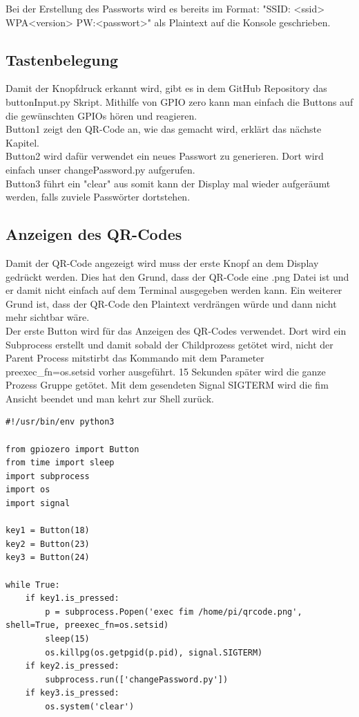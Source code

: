 \documentclass[a4paper,11pt,singlespacing]{article}
\begin{document}
    		Bei der Erstellung des Passworts wird es bereits im Format: "SSID: <ssid> WPA<version> PW:<passwort>" als Plaintext auf die Konsole geschrieben.
    		
    		\subsection{Tastenbelegung}
    		    Damit der Knopfdruck erkannt wird, gibt es in dem GitHub Repository \cite{Quote_github_repo} das buttonInput.py Skript. Mithilfe von GPIO zero kann man einfach die Buttons auf die gewünschten GPIOs hören und reagieren. \\
	    		Button1 zeigt den QR-Code an, wie das gemacht wird, erklärt das nächste Kapitel. \\
	    		Button2 wird dafür verwendet ein neues Passwort zu generieren. Dort wird einfach unser changePassword.py aufgerufen. \\
	    		Button3 führt ein "clear" aus somit kann der Display mal wieder aufgeräumt werden, falls zuviele Passwörter dortstehen.
    		
    		\subsection{Anzeigen des QR-Codes}
    			Damit der QR-Code angezeigt wird muss der erste Knopf an dem Display gedrückt werden. Dies hat den Grund, dass der QR-Code eine .png Datei ist und er damit nicht einfach auf dem Terminal ausgegeben werden kann. Ein weiterer Grund ist, dass der QR-Code den Plaintext verdrängen würde und dann nicht mehr sichtbar wäre. \\
    			Der erste Button wird für das Anzeigen des QR-Codes verwendet. Dort wird ein Subprocess erstellt und damit sobald der Childprozess getötet wird, nicht der Parent Process mitstirbt das Kommando mit dem Parameter preexec\_fn=os.setsid vorher ausgeführt. 15 Sekunden später wird die ganze Prozess Gruppe getötet. Mit dem gesendeten Signal SIGTERM wird die fim Ansicht beendet und man kehrt zur Shell zurück. \\ 
    			\begin{lstlisting}
#!/usr/bin/env python3

from gpiozero import Button
from time import sleep
import subprocess
import os
import signal

key1 = Button(18)
key2 = Button(23)
key3 = Button(24)

while True:
	if key1.is_pressed:
		p = subprocess.Popen('exec fim /home/pi/qrcode.png', shell=True, preexec_fn=os.setsid)
		sleep(15)
		os.killpg(os.getpgid(p.pid), signal.SIGTERM)
	if key2.is_pressed:
		subprocess.run(['changePassword.py'])
	if key3.is_pressed:
		os.system('clear')
    			\end{lstlisting}
    
\end{document}
